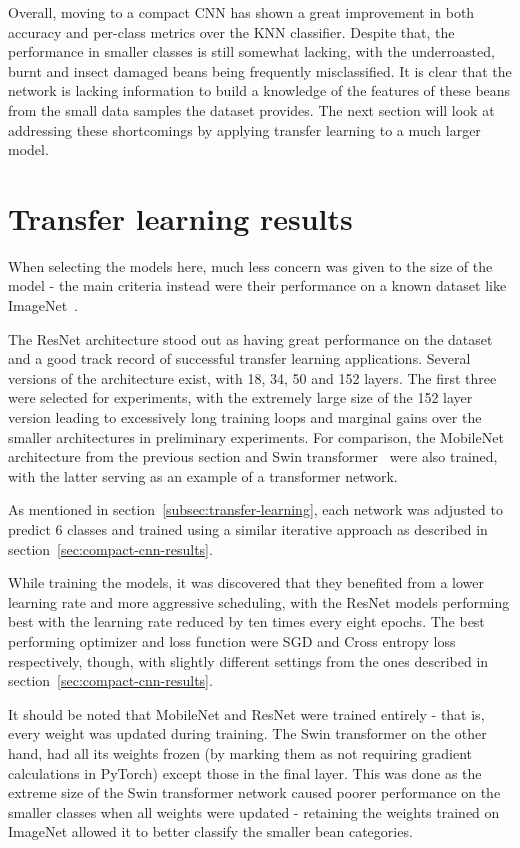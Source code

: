 Overall, moving to a compact CNN has shown a great improvement in both accuracy and per-class metrics over the KNN
classifier.
Despite that, the performance in smaller classes is still somewhat lacking, with the underroasted, burnt and insect damaged
beans being frequently misclassified.
It is clear that the network is lacking information to build a knowledge of the features of these beans from the small
data samples the dataset provides.
The next section will look at addressing these shortcomings by applying transfer learning to a much larger model.
\section{Transfer learning results}
\label{sec:transfer-learning-results}
When selecting the models here, much less concern was given to the size of the model - the main criteria instead were
their performance on a known dataset like ImageNet~\cite{imageNet}.

The ResNet architecture stood out as having great performance on the dataset and a good track record of successful
transfer learning applications.
Several versions of the architecture exist, with 18, 34, 50 and 152 layers.
The first three were selected for experiments, with the extremely large size of the 152 layer version leading to excessively long
training loops and marginal gains over the smaller architectures in preliminary experiments.
For comparison, the MobileNet architecture from the previous section and Swin transformer~\cite{swinTransformer} were also trained,
with the latter serving as an example of a transformer network.

As mentioned in section~\ref{subsec:transfer-learning}, each network was adjusted to predict 6 classes and trained using a similar
iterative approach as described in section~\ref{sec:compact-cnn-results}.

While training the models, it was discovered that they benefited from a lower learning rate and more aggressive scheduling,
with the ResNet models performing best with the learning rate reduced by ten times every eight epochs.
The best performing optimizer and loss function were SGD and Cross entropy loss respectively, though, with slightly different settings
from the ones described in section~\ref{sec:compact-cnn-results}.

It should be noted that MobileNet and ResNet were trained entirely - that is, every weight was updated during training.
The Swin transformer on the other hand, had all its weights frozen (by marking them as not requiring gradient calculations in PyTorch)
except those in the final layer.
This was done as the extreme size of the Swin transformer network caused poorer performance on the smaller classes when all weights were updated -
retaining the weights trained on ImageNet allowed it to better classify the smaller bean categories.

